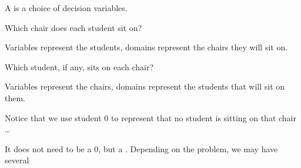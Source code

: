 \documentclass{cons-beamer}
\begin{document}
\begin{flashcardcpmpy}
\begin{frame}
  A  is a choice of decision variables.
  \vfill

  \begin{example}
      Which chair does each student sit on?
    
    Variables represent the students, domains represent the chairs they will sit on.
    \footnotesize
    
    \normalsize
     \vfill

      Which student, if any, sits on each chair?

    Variables represent the chairs, domains represent the students that will sit on them.
    
    \footnotesize
    
    \normalsize
    \vfill

    \alert{Notice that we use student $0$ to represent that no student is sitting on that chair \dots}

    It does not need to be a $0$, but a . Depending on the problem, we may have several 
  \end{example}\vfill
\end{frame}
\end{flashcardcpmpy}
\end{document}
